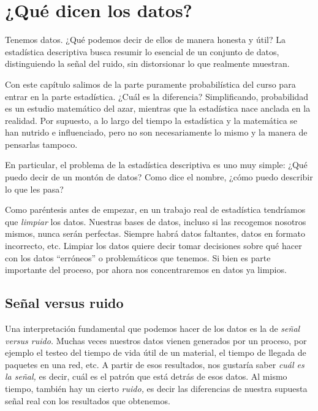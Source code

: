 \chapter{¿Qué dicen los datos?}

\begin{ideanote}
Tenemos datos. ¿Qué podemos decir de ellos de manera honesta y útil? La estadística descriptiva busca resumir lo esencial de un conjunto de datos, distinguiendo la señal del ruido, sin distorsionar lo que realmente muestran.
\end{ideanote}

Con este capítulo salimos de la parte puramente probabilística del curso para entrar en la parte estadística. ¿Cuál es la diferencia? Simplificando, probabilidad es un estudio matemático del azar, mientras que la estadística nace anclada en la realidad. Por supuesto, a lo largo del tiempo la estadística y la matemática se han nutrido e influenciado, pero no son necesariamente lo mismo y la manera de pensarlas tampoco. 

En particular, el problema de la estadística descriptiva es uno muy simple: ¿Qué puedo decir de un montón de datos? Como dice el nombre, ¿cómo puedo describir lo que les pasa?

Como paréntesis antes de empezar, en un trabajo real de estadística tendríamos que \emph{limpiar} los datos. Nuestras bases de datos, incluso si las recogemos nosotros mismos, nunca serán perfectas. Siempre habrá datos faltantes, datos en formato incorrecto, etc. Limpiar los datos quiere decir tomar decisiones sobre qué hacer con los datos \enquote{erróneos} o problemáticos que tenemos. Si bien es parte importante del proceso, por ahora nos concentraremos en datos ya limpios.

\section{Señal versus ruido}

Una interpretación fundamental que podemos hacer de los datos es la de \emph{señal versus ruido.} Muchas veces nuestros datos vienen generados por un proceso, por ejemplo el testeo del tiempo de vida útil de un material, el tiempo de llegada de paquetes en una red, etc. A partir de esos resultados, nos gustaría saber \emph{cuál es la señal,} es decir, cuál es el patrón que está detrás de esos datos. Al mismo tiempo, también hay un cierto \emph{ruido,} es decir las diferencias de nuestra supuesta señal real con los resultados que obtenemos. 

